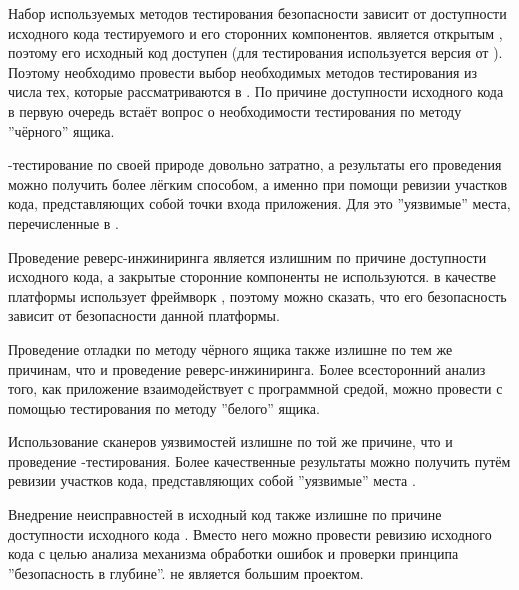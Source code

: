 %
Набор используемых методов тестирования безопасности  зависит от доступности исходного кода тестируемого  и его сторонних компонентов.
%
\PeerHood является открытым , поэтому его исходный код доступен  (для тестирования используется версия  от ). 
%
Поэтому необходимо провести выбор необходимых методов тестирования из числа тех, которые рассматриваются в .
%
По причине доступности исходного кода в первую очередь встаёт вопрос о необходимости тестирования по методу ''чёрного'' ящика. 



%
\Fuzz-тестирование по своей природе довольно затратно, а результаты его проведения можно получить более лёгким способом, а именно при помощи ревизии участков кода, представляющих собой точки входа приложения.
%
Для \PeerHood это ''уязвимые'' места, перечисленные в . 

%
Проведение реверс-инжиниринга является излишним по причине доступности исходного кода, а закрытые сторонние компоненты не используются. 
%
\PeerHood в качестве платформы использует фреймворк \Qt {}, поэтому можно сказать, что его безопасность зависит от безопасности данной платформы. 

%
Проведение отладки по методу чёрного ящика также излишне по тем же причинам, что и проведение реверс-инжиниринга. 
%
Более всесторонний анализ того, как приложение взаимодействует с программной средой, можно провести с помощью тестирования по методу ''белого'' ящика. 
%

%
Использование сканеров уязвимостей излишне по той же причине, что и проведение \fuzz-тестирования. 
%
Более качественные результаты можно получить путём ревизии участков кода, представляющих собой ''уязвимые'' места \PeerHood. 

%
Внедрение неисправностей в исходный код также излишне по причине доступности исходного кода \PeerHood. 
%
Вместо него можно провести ревизию исходного кода с целью анализа механизма обработки ошибок и проверки принципа ''безопасность в глубине''. 
%
\PeerHood не является большим проектом. 

